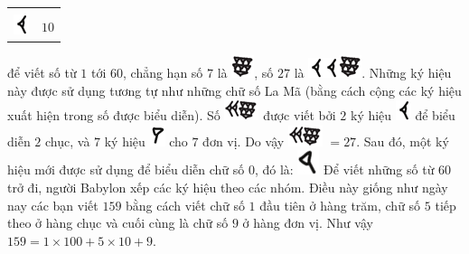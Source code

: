 \begin{multicols}{2}
\begin{table}[H]
\begin{tabular}{|c|c|}
			\hline
			& \\[-2.5ex]
			\includegraphics[scale=0.65]{16}&$10$\\
			\hline
		\end{tabular}
		\vspace*{-5pt}
	\end{table}
	để viết số từ $1$ tới $60$, chẳng hạn số $7$ là  \includegraphics[scale=0.7]{17}, số $27$ là  \includegraphics[scale=0.7]{16}\includegraphics[scale=0.7]{16}\includegraphics[scale=0.7]{17}. 	 
	\vskip 0.1cm
	Những ký hiệu này được sử dụng tương tự như những chữ số La Mã (bằng cách cộng các ký hiệu xuất hiện trong số được biểu diễn). Số \includegraphics[scale=0.7]{18} được viết bởi $2$ ký hiệu \includegraphics[scale=0.7]{16} để biểu diễn $2$ chục, và $7$ ký hiệu \includegraphics[scale=0.7]{15}  cho $7$ đơn vị. Do vậy \includegraphics[scale=0.7]{18}  $=27$.
	\vskip 0.1cm
	Sau đó, một ký hiệu mới được sử dụng để biểu diễn chữ số $0$, đó là:
	\includegraphics[scale=0.65]{15.1}
	\vskip 0.1cm
	Để viết những số từ $60$ trở đi, người Babylon xếp các ký hiệu theo các nhóm. Điều này giống như ngày nay các bạn viết $159$ bằng cách viết chữ số $1$ đầu tiên ở hàng trăm, chữ số $5$ tiếp theo ở hàng chục và cuối cùng là chữ số $9$ ở hàng đơn vị. Như vậy $159 = 1 \times 100+ 5 \times 10+ 9$.

\end{multicols}
